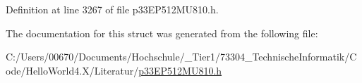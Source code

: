 Definition at line 3267 of file p33\+E\+P512\+M\+U810.\+h.



The documentation for this struct was generated from the following file\+:\begin{DoxyCompactItemize}
\item 
C\+:/\+Users/00670/\+Documents/\+Hochschule/\+\_\+\+Tier1/73304\+\_\+\+Technische\+Informatik/\+Code/\+Hello\+World4.\+X/\+Literatur/\hyperlink{p33_e_p512_m_u810_8h}{p33\+E\+P512\+M\+U810.\+h}\end{DoxyCompactItemize}
